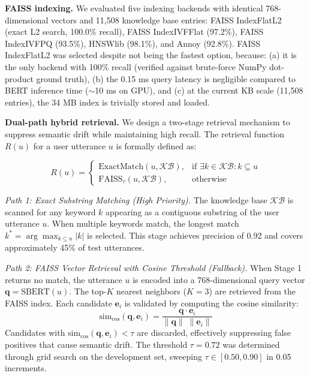 \documentclass[conference]{IEEEtran}
\begin{document}
\textbf{FAISS indexing.}
We evaluated five indexing backends with identical 768-dimensional vectors and
11,508 knowledge base entries: FAISS IndexFlatL2 (exact L2 search, 100.0\%
recall), FAISS IndexIVFFlat (97.2\%), FAISS IndexIVFPQ (93.5\%), HNSWlib
(98.1\%), and Annoy (92.8\%). FAISS IndexFlatL2 was selected despite not being
the fastest option, because: (a) it is the only backend with 100\% recall
(verified against brute-force NumPy dot-product ground truth), (b) the 0.15 ms
query latency is negligible compared to BERT inference time ($\sim$10 ms on GPU),
and (c) at the current KB scale (11,508 entries), the 34 MB index is trivially
stored and loaded.

\textbf{Dual-path hybrid retrieval.}
We design a two-stage retrieval mechanism to suppress semantic drift while
maintaining high recall. The retrieval function $R(u)$ for a user utterance $u$
is formally defined as:

\begin{equation}
R(u) = \begin{cases}
\text{ExactMatch}(u, \mathcal{KB}), & \text{if } \exists k \in \mathcal{KB}: k \subseteq u \\[6pt]
\text{FAISS}_{\tau}(u, \mathcal{KB}), & \text{otherwise}
\end{cases}
\label{eq:retrieval}
\end{equation}

\textit{Path 1: Exact Substring Matching (High Priority).}
The knowledge base $\mathcal{KB}$ is scanned for any keyword $k$ appearing as a
contiguous substring of the user utterance $u$. When multiple keywords match,
the longest match $k^* = \arg\max_{k \subseteq u} |k|$ is selected. This stage
achieves precision of 0.92 and covers approximately 45\% of test utterances.

\textit{Path 2: FAISS Vector Retrieval with Cosine Threshold (Fallback).}
When Stage 1 returns no match, the utterance $u$ is encoded into a 768-dimensional
query vector $\mathbf{q} = \text{SBERT}(u)$. The top-$K$ nearest neighbors ($K=3$)
are retrieved from the FAISS index. Each candidate $\mathbf{e}_i$ is validated
by computing the cosine similarity:
\begin{equation}
\text{sim}_{\cos}(\mathbf{q}, \mathbf{e}_i) = \frac{\mathbf{q} \cdot \mathbf{e}_i}
{\|\mathbf{q}\| \; \|\mathbf{e}_i\|}
\label{eq:cosine}
\end{equation}
Candidates with $\text{sim}_{\cos}(\mathbf{q}, \mathbf{e}_i) < \tau$ are discarded,
effectively suppressing false positives that cause semantic drift.
The threshold $\tau = 0.72$ was determined through grid search on the development
set, sweeping $\tau \in [0.50, 0.90]$ in 0.05 increments.
\end{document}
